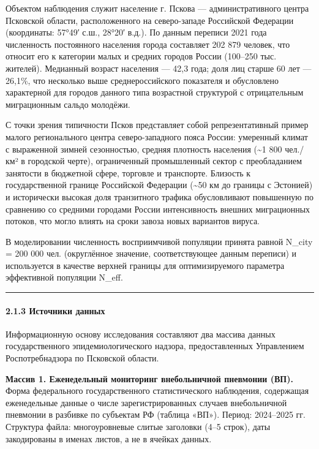 \documentclass[12pt]{article}
\begin{document}
Объектом наблюдения служит население г. Пскова --- административного
центра Псковской области, расположенного на северо-западе Российской
Федерации (координаты: 57°49′ с.ш., 28°20′ в.д.). По данным переписи
2021 года численность постоянного населения города составляет 202 879
человек, что относит его к категории малых и средних городов России
(100--250 тыс. жителей). Медианный возраст населения --- 42,3 года; доля
лиц старше 60 лет --- 26,1\%, что несколько выше среднероссийского
показателя и обусловлено характерной для городов данного типа возрастной
структурой с отрицательным миграционным сальдо молодёжи.

С точки зрения типичности Псков представляет собой репрезентативный
пример малого регионального центра северо-западного пояса России:
умеренный климат с выраженной зимней сезонностью, средняя плотность
населения (\textasciitilde1 800 чел./км² в городской черте),
ограниченный промышленный сектор с преобладанием занятости в бюджетной
сфере, торговле и транспорте. Близость к государственной границе
Российской Федерации (\textasciitilde50 км до границы с Эстонией) и
исторически высокая доля транзитного трафика обусловливают повышенную по
сравнению со средними городами России интенсивность внешних миграционных
потоков, что могло влиять на сроки завоза новых вариантов вируса.

В моделировании численность восприимчивой популяции принята равной
N\_city = 200 000 чел. (округлённое значение, соответствующее данным
переписи) и используется в качестве верхней границы для оптимизируемого
параметра эффективной популяции N\_eff.

\begin{center}\rule{0.5\linewidth}{0.5pt}\end{center}

\paragraph{2.1.3 Источники
данных}\label{ux438ux441ux442ux43eux447ux43dux438ux43aux438-ux434ux430ux43dux43dux44bux445}

Информационную основу исследования составляют два массива данных
государственного эпидемиологического надзора, предоставленных
Управлением Роспотребнадзора по Псковской области.

\textbf{Массив 1. Еженедельный мониторинг внебольничной пневмонии (ВП).}
Форма федерального государственного статистического наблюдения,
содержащая еженедельные данные о числе зарегистрированных случаев
внебольничной пневмонии в разбивке по субъектам РФ (таблица «ВП»).
Период: 2024--2025 гг. Структура файла: многоуровневые слитые заголовки
(4--5 строк), даты закодированы в именах листов, а не в ячейках данных.
\end{document}
